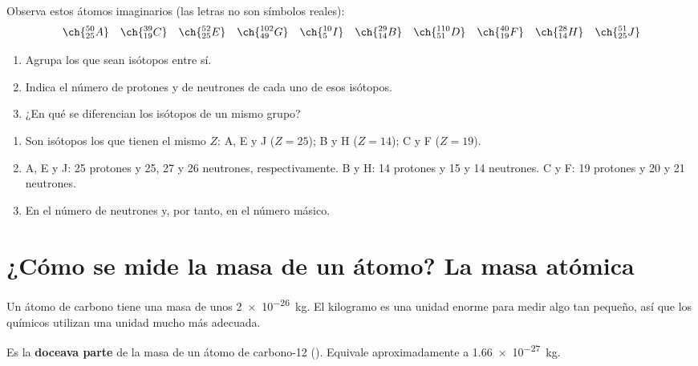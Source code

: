 \begin{exercise}
    Observa estos átomos imaginarios (las letras no son símbolos reales):
    \[ \ch{^{50}_{25}A} \quad \ch{^{39}_{19}C} \quad \ch{^{52}_{25}E} \quad \ch{^{102}_{49}G} \quad \ch{^{10}_{5}I} \quad \ch{^{29}_{14}B} \quad \ch{^{110}_{51}D} \quad \ch{^{40}_{19}F} \quad \ch{^{28}_{14}H} \quad \ch{^{51}_{25}J} \]
    \begin{enumerate}[label=\alph*)]
        \item Agrupa los que sean isótopos entre sí.
        \item Indica el número de protones y de neutrones de cada uno de esos isótopos.
        \item ¿En qué se diferencian los isótopos de un mismo grupo?
    \end{enumerate}
    \begin{solu}
        \begin{enumerate}[label=\alph*)]
            \item Son isótopos los que tienen el mismo \(Z\): A, E y J (\(Z = 25\)); B y H (\(Z = 14\)); C y F (\(Z = 19\)).
            \item A, E y J: 25 protones y 25, 27 y 26 neutrones, respectivamente. B y H: 14 protones y 15 y 14 neutrones. C y F: 19 protones y 20 y 21 neutrones.
            \item En el número de neutrones y, por tanto, en el número másico.
        \end{enumerate}
    \end{solu}
\end{exercise}

\section{¿Cómo se mide la masa de un átomo? La masa atómica}

Un átomo de carbono tiene una masa de unos \qty{2e-26}{\kg}. El kilogramo es una unidad enorme para medir algo tan pequeño, así que los químicos utilizan una unidad mucho más adecuada.

\begin{definition}
    Es la \textbf{doceava parte} de la masa de un átomo de carbono-12 (). Equivale aproximadamente a \qty{1.66e-27}{\kg}.
\end{definition}

